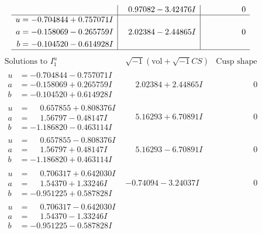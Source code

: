 \documentclass[1p]{elsarticle_modified}
\theoremstyle{definition}
\newcommand{\I}{\sqrt{-1}}
\begin{document}
$$\begin{array}{c|c|c}
 & \phantom{-}0.97082 - 3.42476 I & \phantom{-0.000000 } 0 \\ \hline\begin{aligned}
u &= -0.704844 + 0.757071 I \\
a &= -0.158069 - 0.265759 I \\
b &= -0.104520 - 0.614928 I\end{aligned}
 & \phantom{-}2.02384 - 2.44865 I & \phantom{-0.000000 } 0\\
 \hline 
 \end{array}$$\newpage$$\begin{array}{c|c|c}  
\text{Solutions to }I^u_{1}& \I (\text{vol} + \sqrt{-1}CS) & \text{Cusp shape}\\
 \hline 
\begin{aligned}
u &= -0.704844 - 0.757071 I \\
a &= -0.158069 + 0.265759 I \\
b &= -0.104520 + 0.614928 I\end{aligned}
 & \phantom{-}2.02384 + 2.44865 I & \phantom{-0.000000 } 0 \\ \hline\begin{aligned}
u &= \phantom{-}0.657855 + 0.808376 I \\
a &= \phantom{-}1.56797 - 0.48147 I \\
b &= -1.186820 - 0.463114 I\end{aligned}
 & \phantom{-}5.16293 + 6.70891 I & \phantom{-0.000000 } 0 \\ \hline\begin{aligned}
u &= \phantom{-}0.657855 - 0.808376 I \\
a &= \phantom{-}1.56797 + 0.48147 I \\
b &= -1.186820 + 0.463114 I\end{aligned}
 & \phantom{-}5.16293 - 6.70891 I & \phantom{-0.000000 } 0 \\ \hline\begin{aligned}
u &= \phantom{-}0.706317 + 0.642030 I \\
a &= \phantom{-}1.54370 + 1.33246 I \\
b &= -0.951225 + 0.587828 I\end{aligned}
 & -0.74094 - 3.24037 I & \phantom{-0.000000 } 0 \\ \hline\begin{aligned}
u &= \phantom{-}0.706317 - 0.642030 I \\
a &= \phantom{-}1.54370 - 1.33246 I \\
b &= -0.951225 - 0.587828 I\end{aligned}

\end{array}$$
\end{document}
